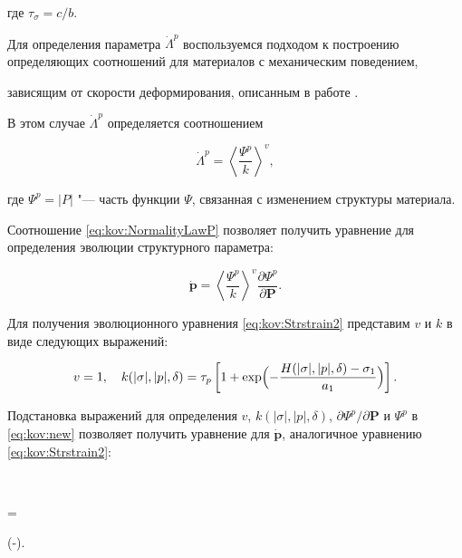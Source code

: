 где $\tau_{\sigma}=c/b$.



Для определения параметра $\dot{\Lambda}^{p}$ воспользуемся подходом к построению определяющих соотношений для материалов с механическим поведением,

зависящим от скорости деформирования, описанным в работе \cite{kostina:bib:MurakamiB}.

В этом случае $\dot{\Lambda}^{p}$ определяется соотношением

$$

\dot{\Lambda}^{p}=\left\langle \frac{\Psi^p}{k} \right\rangle ^v,

$$

где  $\Psi^p= |  P | $ "--- часть функции $\Psi$, связанная с изменением структуры материала. 

Соотношение  \eqref{eq:kov:NormalityLawP} позволяет получить уравнение для определения эволюции структурного параметра:

\begin{equation}

\dot{\boldsymbol{p}}=\left \langle \frac{\Psi^p}{k} \right \rangle ^v \frac{\partial \Psi^{p}}{\partial{\boldsymbol{P}}}.

\label{eq:kov:new}

\end{equation}

Для получения эволюционного уравнения \eqref{eq:kov:Strstrain2} представим $v$ и $k$ в виде следующих выражений:

\begin{gather*}

v=1,\quad

k( | \sigma | , |  p | ,\delta)=\tau_{p}\left[1+\exp \Bigl( {-\frac{H( | \sigma | , |  p | ,\delta)-\sigma_{1}}{a_{1}}} \Bigr) \right].

\end{gather*}

Подстановка выражений для определения $v$, $k( | \sigma | , |  p | ,\delta)$, ${\partial \Psi^{p}}/{\partial{\boldsymbol{P}}}$  и $\Psi^{p}$ в \eqref{eq:kov:new} позволяет получить уравнение для $\dot{\boldsymbol{p}}$, аналогичное уравнению \eqref{eq:kov:Strstrain2}:

$$

=

\Bigl(\boldsymbol{\sigma}-\Bigr).


